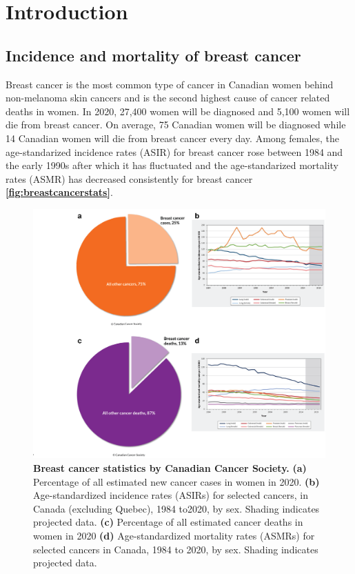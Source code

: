 
\chapter{Introduction}
\label{ch:Introduction}

\section{Incidence and mortality of breast cancer}
Breast cancer is the most common type of cancer in Canadian women behind non-melanoma skin cancers and is the second highest cause of cancer related deaths in women. In 2020, 27,400 women will be diagnosed and 5,100 women will die from breast cancer. On average, 75 Canadian women will be diagnosed while 14 Canadian women will die from breast cancer every day. Among females, the age-standarized incidence rates (ASIR) for breast cancer rose between 1984 and the early 1990s after which it has fluctuated and the age-standarized mortality rates (ASMR) has decreased consistently for breast cancer \cite{canadian2020canadian} \textbf{\autoref{fig:breastcancerstats}}.

\begin{figure}
\centering
\includegraphics[width=\textwidth]{Figures/chap1/breastcancerstats.png}
	\caption[Breast cancer statistics by Canadian cancer society ]
	{\small
	    \textbf{Breast cancer statistics by Canadian Cancer Society.}
	    \textbf{(a)} Percentage of all estimated new cancer cases in women in 2020.
	    \textbf{(b)} Age-standardized incidence rates (ASIRs) for selected cancers, in Canada (excluding Quebec), 1984 to2020, by sex. Shading indicates projected data.
	    \textbf{(c)} Percentage of all estimated cancer deaths in women in 2020
	     \textbf{(d)} Age-standardized mortality rates (ASMRs) for selected cancers in Canada, 1984 to 2020, by sex. Shading indicates projected data.
	}
	\label{fig:breastcancerstats}
\end{figure}

